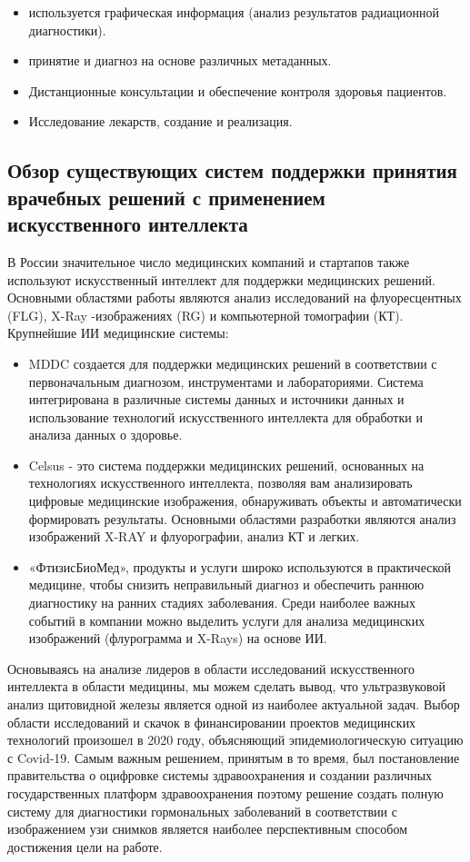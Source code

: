 \begin{itemize}
    \item используется графическая информация (анализ результатов радиационной диагностики).
    \item принятие и диагноз на основе различных метаданных.
    \item Дистанционные консультации и обеспечение контроля здоровья пациентов.
    \item Исследование лекарств, создание и реализация.
\end{itemize}

\subsection{Обзор существующих систем поддержки принятия врачебных решений с применением искусственного интеллекта}
В России значительное число медицинских компаний и стартапов также используют искусственный интеллект для поддержки медицинских решений. Основными областями работы являются анализ исследований на флуоресцентных (FLG), X-Ray -изображениях (RG) и компьютерной томографии (КТ).\\
Крупнейшие ИИ медицинские системы\cite{webiomed2024ai_healthcare}:\\
\begin{itemize}
    \item MDDC создается для поддержки медицинских решений в соответствии с первоначальным диагнозом, инструментами и лабораториями. Система интегрирована в различные системы данных и источники данных и использование технологий искусственного интеллекта для обработки и анализа данных о здоровье.
    \item Celsus - это система поддержки медицинских решений, основанных на технологиях искусственного интеллекта, позволяя вам анализировать цифровые медицинские изображения, обнаруживать объекты и автоматически формировать результаты. Основными областями разработки являются анализ изображений X-RAY и флуорографии, анализ КТ и легких.
    \item «ФтизисБиоМед», продукты и услуги широко используются в практической медицине, чтобы снизить неправильный диагноз и обеспечить раннюю диагностику на ранних стадиях заболевания. Среди наиболее важных событий в компании можно выделить услуги для анализа медицинских изображений (флурограмма и X-Rays) на основе ИИ.
\end{itemize}
Основываясь на анализе лидеров в области исследований искусственного интеллекта в области медицины, мы можем сделать вывод, что ультразвуковой анализ щитовидной железы является одной из наиболее актуальной задач. Выбор области исследований и скачок в финансировании проектов медицинских технологий произошел в 2020 году, объясняющий эпидемиологическую ситуацию с Covid-19. Самым важным решением, принятым в то время, был постановление правительства о оцифровке системы здравоохранения и создании различных государственных платформ здравоохранения поэтому решение создать полную систему для диагностики гормональных заболеваний в соответствии с изображением узи снимков является наиболее перспективным способом достижения цели на работе.\\
